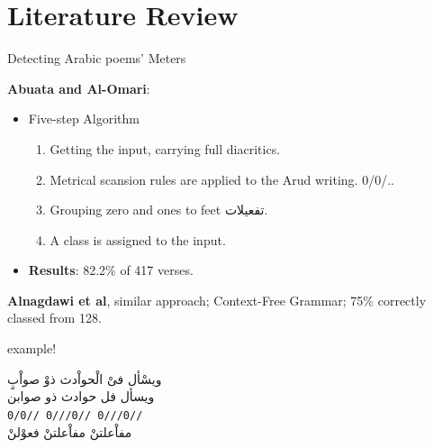 \documentclass[10pt]{beamer}
\begin{document}
\section{Literature Review}
\begin{frame}[fragile]{Detecting Arabic poems' Meters}

\textbf{Abuata and Al-Omari}:
    \begin{itemize}
        \item Five-step Algorithm
            \begin{enumerate}
                \item Getting the input, carrying full diacritics.
                \item Metrical scansion rules are applied to the Arud writing. 0/0/..
                \item Grouping zero and ones to feet \textarabic{تفعيلات}.
                \item A class is assigned  to the input.
            \end{enumerate}
        \item \textbf{\alert{Results}}: 82.2\% of 417 verses.
    \end{itemize}
\textbf{Alnagdawi et al}, similar approach;  Context-Free Grammar; 75\% correctly
classed from 128.
\end{frame}

\begin{frame}[fragile]{example!}

\begin{center}
  \textarabic{ويسْأل فىْ الْحواْدث ذوْ صواْبٍ}\\
  \textarabic{ويسأل فل \hspace{0.4cm}
    حوادث ذو\hspace{0.4cm}
    صوابن}\\
  \texttt{0/0//     \hspace{0.3cm}
          0///0//   \hspace{0.3cm}
          0///0//}\\

  \textarabic{مفاْعلتنْ\hspace{0.7cm} 
    مفاْعلتنْ          \hspace{0.7cm}
    فعوْلنْ}
\end{center}

\end{frame}
\end{document}
